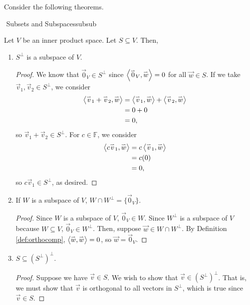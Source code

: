         Consider the following theorems.
        \begin{theorem}{\Stop\,\,Subsets and Subspaces}{subsub}

            Let \(V\) be an inner product space. Let \(S\subseteq V\). Then,
            \begin{enumerate}
                \item \(S^\perp\) is a subspace of \(V\).
                \begin{proof}
                    We know that \(\vec{0}_V\in S^\perp\) since \(\left\langle \overset{_{\rightharpoonup}}{0}_V,\overset{_{\rightharpoonup}}{w}\right\rangle=0\) for all \(\vec{w}\in S\). If we take \(\vec{v}_1,\vec{v}_2\in S^\perp\), we consider
                    \begin{align*}
                        \left\langle \overset{_{\rightharpoonup}}{v}_1+\overset{_{\rightharpoonup}}{v}_2,\overset{_{\rightharpoonup}}{w}\right\rangle&=\left\langle \overset{_{\rightharpoonup}}{v}_1,\overset{_{\rightharpoonup}}{w}\right\rangle+\left\langle \overset{_{\rightharpoonup}}{v}_2,\overset{_{\rightharpoonup}}{w}\right\rangle \\
                        &=0+0 \\
                        &=0,
                    \end{align*}
                    so \(\vec{v}_1+\vec{v}_2\in S^\perp\). For \(c\in\mathbb{F}\), we consider
                    \begin{align*}
                        \left\langle c\overset{_{\rightharpoonup}}{v}_1,\overset{_{\rightharpoonup}}{w}\right\rangle&=c\left\langle \overset{_{\rightharpoonup}}{v}_1,\overset{_{\rightharpoonup}}{w}\right\rangle \\
                        &=c(0) \\
                        &=0,
                    \end{align*}
                    so \(c\vec{v}_1\in S^\perp\), as desired.
                \end{proof}
                \item If \(W\) is a subspace of \(V\), \(W\cap W^\perp=\{\vec{0}_V\}\).
                \begin{proof}
                    Since \(W\) is a subspace of \(V\), \(\vec{0}_V\in W\). Since \(W^\perp\) is a subspace of \(V\) because \(W\subseteq V\), \(\vec{0}_V\in W^\perp\). Then, suppose \(\vec{w}\in W\cap W^\perp\). By Definition \ref{def:orthocomp}, \(\left\langle \overset{_{\rightharpoonup}}{w},\overset{_{\rightharpoonup}}{w}\right\rangle=0\), so \(\vec{w}=\vec{0}_V\).
                \end{proof}
                \item \(S\subseteq (S^\perp)^\perp\).
                \begin{proof}
                    Suppose we have \(\vec{v}\in S\). We wish to show that \(\vec{v}\in (S^{\perp})^\perp\). That is, we must show that \(\vec{v}\) is orthogonal to all vectors in \(S^\perp\), which is true since \(\vec{v}\in S\).
                \end{proof}
            \end{enumerate}
            
        \end{theorem}
